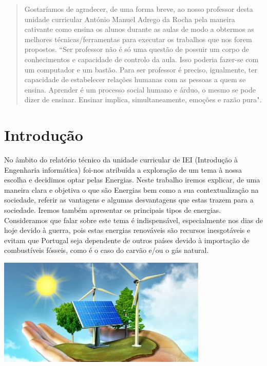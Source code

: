 \documentclass{report}
\begin{document}
\renewcommand{\abstractname}{Agradecimentos}
\begin{abstract}
Gostaríamos de agradecer, de uma forma breve, ao nosso professor desta unidade curricular António Manuel Adrego da Rocha pela maneira cativante como ensina os alunos durante as aulas de modo a obtermos as melhores técnicas/ferramentas para executar os trabalhos que nos forem propostos.
“Ser professor não é só uma questão de possuir um corpo de
conhecimentos e capacidade de controlo da aula. Isso
poderia fazer-se com um computador e um bastão. Para ser
professor é preciso, igualmente, ter capacidade de
estabelecer relações humanas com as pessoas a quem se
ensina. Aprender é um processo social humano e árduo, o
mesmo se pode dizer de ensinar. Ensinar implica,
simultaneamente, emoções e razão pura". 
\end{abstract}


\tableofcontents


\clearpage
{}

\chapter{Introdução}
\label{chap.introducao}
No âmbito do relatório técnico da unidade curricular de IEI (Introdução à Engenharia informática) foi-nos atribuída a exploração de um tema à nossa escolha e decidimos optar pelas Energias. Neste trabalho iremos explicar, de uma maneira clara e objetiva o que são Energias bem como a sua contextualização na sociedade, referir as vantagens e algumas desvantagens que estas trazem para a sociedade. Iremos também apresentar os principais tipos de energias. Consideramos que falar sobre este tema é indispensável, especialmente nos dias de hoje devido à guerra, pois estas energias renováveis são recursos inesgotáveis e evitam que Portugal seja dependente de outros países devido à importação de combustíveis fósseis, como é o caso do carvão e/ou o gás natural.

\begin{center}
\includegraphics[width=10cm]{Trabalho IEI/fontes.jpg}
\end{center}
\end{document}
